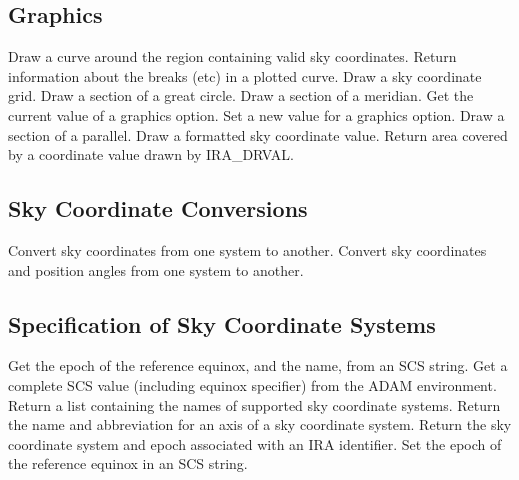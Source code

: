 \subsection {Graphics}
   {Draw a curve around the region containing valid sky coordinates.}
   {Return information about the breaks (etc) in a plotted curve.}
   {Draw a sky coordinate grid.}
   {Draw a section of a great circle.}
   {Draw a section of a meridian.}
   {Get the current value of a graphics option.}
   {Set a new value for a graphics option.}
   {Draw a section of a parallel.}
   {Draw a formatted sky coordinate value.}
   {Return area covered by a coordinate value drawn by IRA\_DRVAL.}

\subsection {Sky Coordinate Conversions}
   {Convert sky coordinates from one system to another.}
   {Convert sky coordinates and position angles from one system to another.}

\subsection {Specification of Sky Coordinate Systems}
   {Get the epoch of the reference equinox, and the name, from an SCS string.}
   {Get a complete SCS value (including equinox specifier) from the ADAM 
    environment.}
   {Return a list containing the names of supported sky coordinate systems.}
   {Return the name and abbreviation for an axis of a sky coordinate system.}
   {Return the sky coordinate system and epoch associated with an IRA 
    identifier.}
   {Set the epoch of the reference equinox in an SCS string.}

